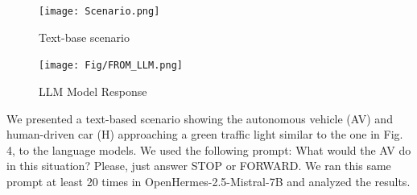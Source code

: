 \documentclass[conference]{IEEEtran}
\begin{document}




\begin{figure}[h]
    \centering
    \texttt{[image: Scenario.png]}
    \caption{Text-base scenario}
    \label{fig:enter-label}
\end{figure}




\begin{figure}[h]
     \centering
     \texttt{[image: Fig/FROM\_LLM.png]}
     \caption{LLM Model Response}
     \label{fig:enter-label}
 \end{figure}
We presented a text-based scenario showing the autonomous vehicle (AV) and human-driven car (H) approaching a green traffic light similar to the one in Fig. 4, to the language models. We used the following prompt: What would the AV do in this situation? Please, just answer STOP or FORWARD. We ran this same prompt at least 20 times in OpenHermes-2.5-Mistral-7B and analyzed the results.
\end{document}
